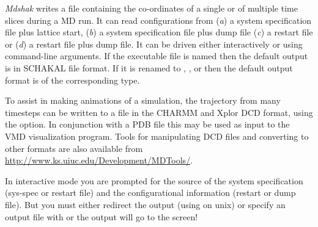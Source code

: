 \documentclass[a4paper,twoside]{report}
\begin{document}
\emph{Mdshak} writes a file containing the co-ordinates of a
single or of multiple time slices during a MD run.  It can read
configurations from (\emph{a}) a system specification file plus
lattice start, (\emph{b}) a system specification file plus dump file
(\emph{c}) a restart file or (\emph{d}) a restart file plus dump file.
It can be driven either interactively or using command-line arguments.
If the executable file is named  then the default output
is in SCHAKAL file format. If it is renamed to ,
,   or  then the default
output format is of the corresponding type.

To assist in making animations of a simulation, the trajectory from
many timesteps can be written to a file in the  CHARMM and Xplor DCD
format, using the \Lit{[-v]} option.  In conjunction with a PDB file
this may be used as input to the VMD visualization program.  Tools for
manipulating DCD files and converting to other formats are also
available from \url{http://www.ks.uiuc.edu/Development/MDTools/}.

In interactive mode you are prompted for the source of the system
specification (sys-spec or restart file) and the configurational
information (restart or dump file).  But you must either redirect the
output (using \Lit{>} on unix) or specify an output file with 
or the output will go to the screen!
\end{document}

